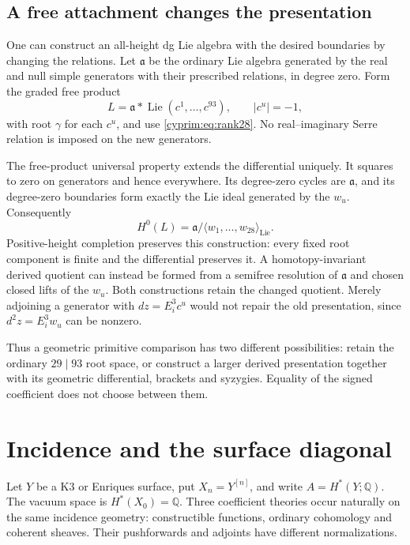\subsection{A free attachment changes the presentation}

One can construct an all-height dg Lie algebra with the
desired boundaries by changing the relations. Let
$\mathfrak a$ be the ordinary Lie algebra generated by
the real and null simple generators with their prescribed
relations, in degree zero. Form the graded free product
\begin{equation}\label{cyprim:eq:attachment}
 L=\mathfrak a*\operatorname{Lie}(c^1,\ldots,c^{93}),
 \qquad |c^u|=-1,
\end{equation}
with root $\gamma$ for each $c^u$, and use
\eqref{cyprim:eq:rank28}. No real--imaginary Serre relation
is imposed on the new generators.

The free-product universal property extends the differential
uniquely. It squares to zero on generators and hence everywhere.
Its degree-zero cycles are $\mathfrak a$, and its degree-zero
boundaries form exactly the Lie ideal generated by the $w_u$.
Consequently
\[
 H^0(L)=\mathfrak a/\langle w_1,\ldots,w_{28}\rangle_{\mathrm{Lie}}.
\]
Positive-height completion preserves this construction:
every fixed root component is finite and the differential
preserves it. A homotopy-invariant derived quotient can
instead be formed from a semifree resolution of
$\mathfrak a$ and chosen closed lifts of the $w_u$.
Both constructions retain the changed quotient. Merely
adjoining a generator with $dz=E_i^3c^u$ would not repair
the old presentation, since $d^2z=E_i^3w_u$ can be nonzero.

Thus a geometric primitive comparison has two different
possibilities: retain the ordinary $29\mid93$ root space,
or construct a larger derived presentation together with
its geometric differential, brackets and syzygies. Equality
of the signed coefficient does not choose between them.

\section{Incidence and the surface diagonal}
\label{cyprim:sec:incidence}

Let $Y$ be a K3 or Enriques surface, put $X_n=Y^{[n]}$,
and write $A=H^*(Y;\mathbb Q)$. The vacuum space is
$H^*(X_0)=\mathbb Q$. Three coefficient theories occur
naturally on the same incidence geometry: constructible
functions, ordinary cohomology and coherent sheaves.
Their pushforwards and adjoints have different normalizations.

